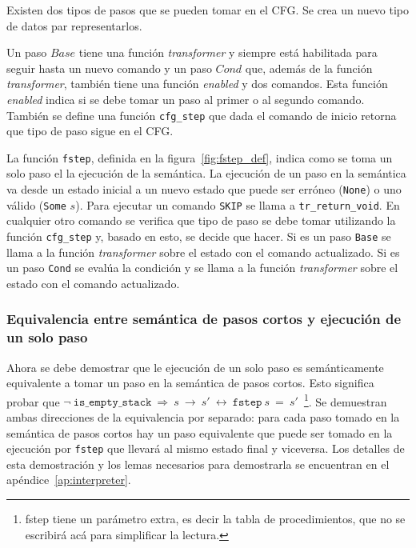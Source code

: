 Existen dos tipos de pasos que se pueden tomar en el CFG.
Se crea un nuevo tipo de datos par representarlos.


Un paso $Base$ tiene una función \textit{transformer} y siempre está habilitada para seguir hasta un nuevo comando y un paso $Cond$ que, además de la función \textit{transformer}, también tiene una función \textit{enabled} y dos comandos.
Esta función \textit{enabled} indica si se debe tomar un paso al primer o al segundo comando.
También se define una función \verb|cfg_step| que dada el comando de inicio retorna que tipo de paso sigue en el CFG.

La función \verb|fstep|, definida en la figura~\ref{fig:fstep_def}, indica como se toma un solo paso el la ejecución de la semántica.
La ejecución de un paso en la semántica va desde un estado inicial a un nuevo estado que puede ser erróneo (\verb|None|) o uno válido (\verb|Some| $s$).
Para ejecutar un comando \verb|SKIP| se llama a \verb|tr_return_void|.
En cualquier otro comando se verifica que tipo de paso se debe tomar utilizando la función \verb|cfg_step| y, basado en esto, se decide que hacer.
Si es un paso \verb|Base| se llama a la función \textit{transformer} sobre el estado con el comando actualizado.
Si es un paso \verb|Cond| se evalúa la condición y se llama a la función \textit{transformer} sobre el estado con el comando actualizado.

\subsubsection*{Equivalencia entre semántica de pasos cortos y ejecución de un solo paso}\label{subsubsection:equality_ss_ss}

Ahora se debe demostrar que le ejecución de un solo paso es semánticamente equivalente a tomar un paso en la semántica de pasos cortos.
Esto significa probar que $\neg\ \mathtt{is\_empty\_stack}\ \Longrightarrow\ s\ \rightarrow\ s'\ \longleftrightarrow\ \mathtt{fstep}\ s\ =\ s'$~\footnote{fstep tiene un parámetro extra, es decir la tabla de procedimientos, que no se escribirá acá para simplificar la lectura.}.
Se demuestran ambas direcciones de la equivalencia por separado: para cada paso tomado en la semántica de pasos cortos hay un paso equivalente que puede ser tomado en la ejecución por \verb|fstep| que llevará al mismo estado final y viceversa.
Los detalles de esta demostración y los lemas necesarios para demostrarla se encuentran en el apéndice~\ref{ap:interpreter}.


